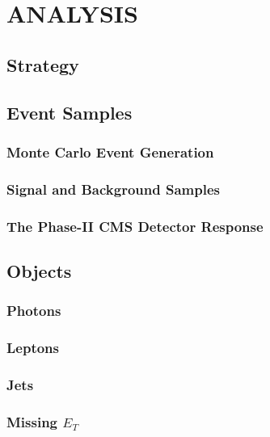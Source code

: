 \chapter{ANALYSIS}\label{ch:Ch3}
\vspace*{-12pt} %

\section{Strategy}

\section{Event Samples}

\subsection{Monte Carlo Event Generation}

\subsection{Signal and Background Samples}

\subsection{The Phase-II CMS Detector Response}

\section{Objects}

\subsection{Photons}

\subsection{Leptons}

\subsection{Jets}

\subsection{Missing $E_{T}$}

